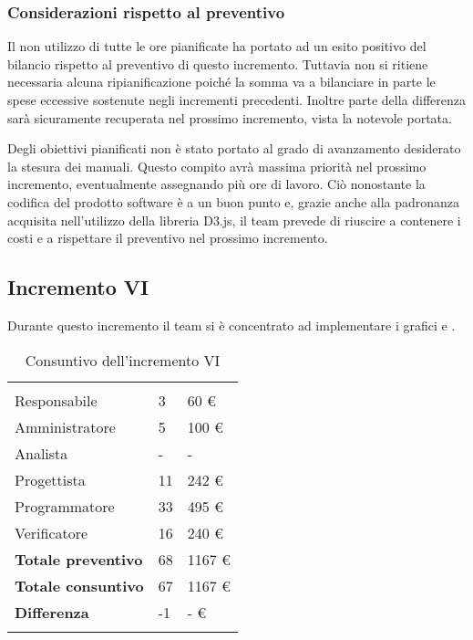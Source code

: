 \subsubsection{Considerazioni rispetto al preventivo}

Il non utilizzo di tutte le ore pianificate ha portato ad un esito positivo del bilancio rispetto al preventivo di questo incremento. Tuttavia non si ritiene necessaria alcuna ripianificazione poiché la somma va a bilanciare in parte le spese eccessive sostenute negli incrementi precedenti. Inoltre parte della differenza sarà sicuramente recuperata nel prossimo incremento, vista la notevole portata. 

Degli obiettivi pianificati non è stato portato al grado di avanzamento desiderato la stesura dei manuali. Questo compito avrà massima priorità nel prossimo incremento, eventualmente assegnando più ore di lavoro. Ciò nonostante la codifica del prodotto software è a un buon punto e, grazie anche alla padronanza acquisita nell'utilizzo della libreria D3.js, il team prevede di riuscire a contenere i costi e a rispettare il preventivo nel prossimo incremento.

\newpage

\subsection{Incremento VI}
Durante questo incremento il team si è concentrato ad implementare i grafici  e .

{
\setlength\arrayrulewidth{1pt}
\begin{longtable}{ C{4cm} C{3cm} C{3.5cm}} 
 	 &
 	 &
 	 \\
 	
 	Responsabile & 3  & 60 € \\
 	Amministratore & 5 & 100 €\\
 	Analista & - & - \\
 	Progettista & 11 & 242 € \\
 	Programmatore & 33  & 495 € \\
 	Verificatore & 16 & 240 €\\
 	
	\hline 	
 	
 	\textbf{Totale preventivo} &
	68 &
 	1167 € \\		
 	
 	\textbf{Totale consuntivo} &
	67 &
 	1167 € \\	
 	
 	\textbf{Differenza} &
	-1 &
 	- € \\	
 	
 	\caption{Consuntivo dell'incremento VI}
\end{longtable}
}

